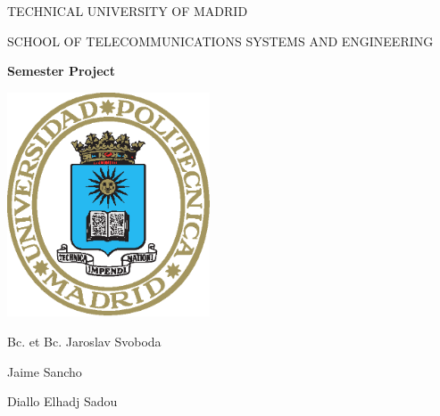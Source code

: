 \documentclass[UKenglish,10pt,a4paper]{report}
\begin{document}
\begin{titlepage}


\pagestyle{empty}
\begin{center}

\large

TECHNICAL UNIVERSITY OF MADRID

\medskip

SCHOOL OF TELECOMMUNICATIONS SYSTEMS AND ENGINEERING

\vfill

{\bf\Large Semester Project}

\vfill
\centerline{\mbox{\includegraphics[width=60mm]{img/logo2.eps}}}
			
\vfill
\vspace{5mm}

{\LARGE Bc. et Bc. Jaroslav Svoboda}

{\LARGE Jaime Sancho}

{\LARGE Diallo Elhadj Sadou}


\end{center}
\end{titlepage}
\end{document}

